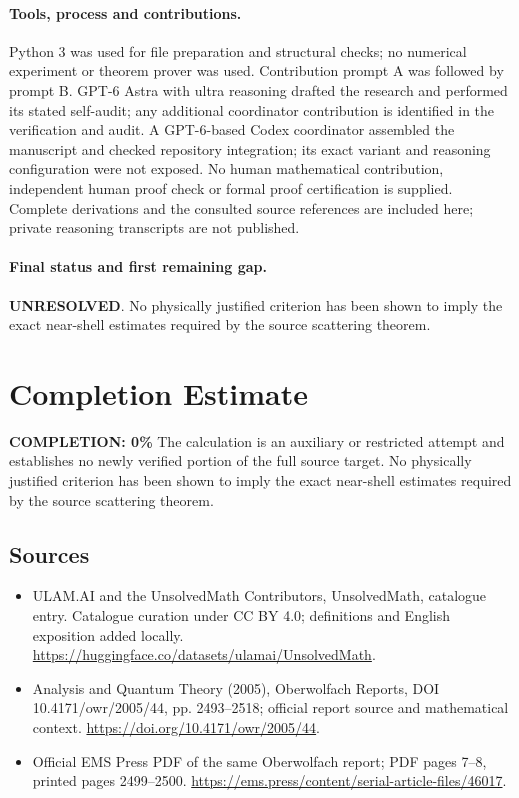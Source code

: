 \documentclass[11pt]{article}
\begin{document}
\paragraph{Tools, process and contributions.}
Python 3 was used for file preparation and structural checks; no numerical experiment or theorem prover was used. Contribution prompt A was followed by prompt B. GPT-6 Astra with ultra reasoning drafted the research and performed its stated self-audit; any additional coordinator contribution is identified in the verification and audit. A GPT-6-based Codex coordinator assembled the manuscript and checked repository integration; its exact variant and reasoning configuration were not exposed. No human mathematical contribution, independent human proof check or formal proof certification is supplied. Complete derivations and the consulted source references are included here; private reasoning transcripts are not published.

\paragraph{Final status and first remaining gap.}
\textbf{UNRESOLVED}. No physically justified criterion has been shown to imply the exact near-shell estimates required by the source scattering theorem.

\section{Completion Estimate}
\noindent\textbf{COMPLETION: 0\%}
The calculation is an auxiliary or restricted attempt and establishes no newly verified portion of the full source target. No physically justified criterion has been shown to imply the exact near-shell estimates required by the source scattering theorem.

\subsection{Sources}
\begin{itemize}
\item[\hypertarget{source:statement:1}{S1}] ULAM.AI and the UnsolvedMath Contributors, UnsolvedMath, catalogue entry. Catalogue curation under CC BY 4.0; definitions and English exposition added locally.
\url{https://huggingface.co/datasets/ulamai/UnsolvedMath}.
\item[\hypertarget{source:statement:2}{S2}] Analysis and Quantum Theory (2005), Oberwolfach Reports, DOI 10.4171/owr/2005/44, pp. 2493--2518; official report source and mathematical context.
\url{https://doi.org/10.4171/owr/2005/44}.
\item[\hypertarget{source:statement:3}{S3}] Official EMS Press PDF of the same Oberwolfach report; PDF pages 7--8, printed pages 2499--2500.
\url{https://ems.press/content/serial-article-files/46017}.
\end{itemize}
\label{end:statement}
\end{document}
